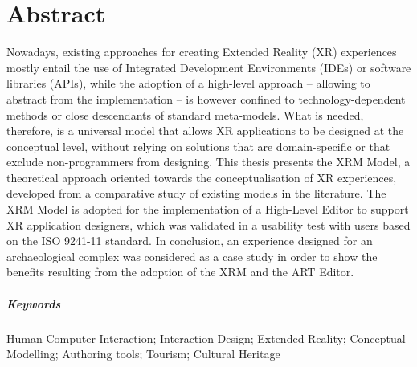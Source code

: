 \chapter{Abstract}

Nowadays, existing approaches for creating Extended Reality (XR) experiences mostly entail the use of Integrated Development Environments (IDEs) or software libraries (APIs), while the adoption of a high-level approach -- allowing to abstract from the implementation -- is however confined to technology-dependent methods or close descendants of standard meta-models.
What is needed, therefore, is a universal model that allows XR applications to be designed at the conceptual level, without relying on solutions that are domain-specific or that exclude non-programmers from designing. This thesis presents the XRM Model, a theoretical approach oriented towards the conceptualisation of XR experiences, developed from a comparative study of existing models in the literature. The XRM Model is adopted for the implementation of a High-Level Editor to support XR application designers, which was validated in a usability test with users based on the ISO 9241-11 standard. In conclusion, an experience designed for an archaeological complex was considered as a case study in order to show the benefits resulting from the adoption of the XRM and the ART Editor.


\paragraph{Keywords}  Human-Computer Interaction; Interaction Design; Extended Reality; Conceptual Modelling; Authoring tools; Tourism; Cultural Heritage